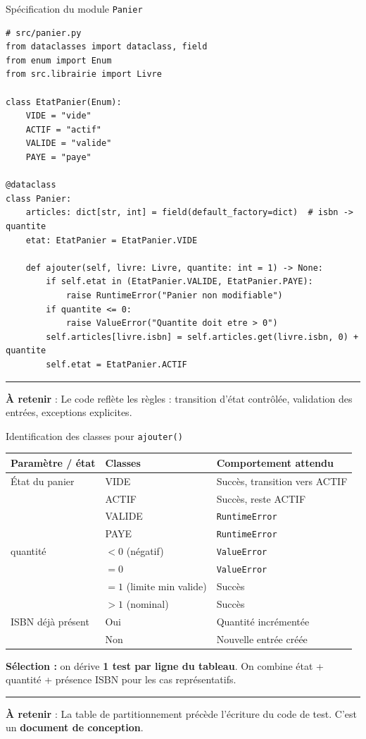 \documentclass[aspectratio=169,11pt]{beamer}
\newcommand{\takeaway}[1]{%
\vfill\begin{beamercolorbox}[wd=\linewidth,sep=0.4em]{}
\color{accent2}\rule[0.6ex]{1.2em}{1.2pt}\hspace{0.4em}%
\textbf{\color{accent2}\small À retenir} \textcolor{textsoft}{:} %
{\small\color{textmain}#1}
\end{beamercolorbox}}
\begin{document}
\begin{frame}[fragile,t,shrink=15]{Sp\'ecification du module \texttt{Panier}}
\begin{lstlisting}[style=pythondark]
# src/panier.py
from dataclasses import dataclass, field
from enum import Enum
from src.librairie import Livre

class EtatPanier(Enum):
    VIDE = "vide"
    ACTIF = "actif"
    VALIDE = "valide"
    PAYE = "paye"

@dataclass
class Panier:
    articles: dict[str, int] = field(default_factory=dict)  # isbn -> quantite
    etat: EtatPanier = EtatPanier.VIDE

    def ajouter(self, livre: Livre, quantite: int = 1) -> None:
        if self.etat in (EtatPanier.VALIDE, EtatPanier.PAYE):
            raise RuntimeError("Panier non modifiable")
        if quantite <= 0:
            raise ValueError("Quantite doit etre > 0")
        self.articles[livre.isbn] = self.articles.get(livre.isbn, 0) + quantite
        self.etat = EtatPanier.ACTIF
\end{lstlisting}
\takeaway{Le code reflète les règles : transition d'état contrôlée, validation des entrées, exceptions explicites.}
\end{frame}

\begin{frame}[t,shrink=10]{Identification des classes pour \texttt{ajouter()}}
\footnotesize
\begin{tabular}{@{}p{3.2cm} p{2.8cm} p{6.5cm}@{}}
\toprule
\textbf{Paramètre / état} & \textbf{Classes} & \textbf{Comportement attendu} \\
\midrule
État du panier & VIDE & Succès, transition vers ACTIF \\
& ACTIF & Succès, reste ACTIF \\
& VALIDE & \texttt{RuntimeError} \\
& PAYE & \texttt{RuntimeError} \\
\addlinespace[0.15em]
quantité & $< 0$ (négatif) & \texttt{ValueError} \\
& $= 0$ & \texttt{ValueError} \\
& $= 1$ (limite min valide) & Succès \\
& $> 1$ (nominal) & Succès \\
\addlinespace[0.15em]
ISBN déjà présent & Oui & Quantité incrémentée \\
& Non & Nouvelle entrée créée \\
\bottomrule
\end{tabular}
\vspace{0.4cm}
\textbf{Sélection :} on dérive \textbf{1 test par ligne du tableau}. On combine état + quantité + présence ISBN pour les cas représentatifs.
\takeaway{La table de partitionnement précède l'écriture du code de test. C'est un \textbf{document de conception}.}
\end{frame}
\end{document}
